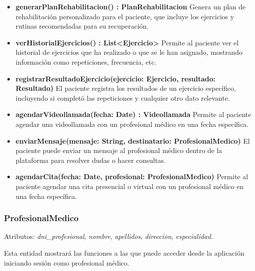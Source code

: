 \documentclass{article}
\begin{document}
\begin{itemize}
	\item \textbf{generarPlanRehabilitacion() : PlanRehabilitacion}  
	Genera un plan de rehabilitación personalizado para el paciente, que incluye los ejercicios y rutinas recomendadas para su recuperación.
	
	\item \textbf{verHistorialEjercicios() : List<Ejercicio>}  
	Permite al paciente ver el historial de ejercicios que ha realizado o que se le han asignado, mostrando información como repeticiones, frecuencia, etc.
	
	\item \textbf{registrarResultadoEjercicio(ejercicio: Ejercicio, resultado: Resultado)}  
	El paciente registra los resultados de un ejercicio específico, incluyendo si completó las repeticiones y cualquier otro dato relevante.
	
	\item \textbf{agendarVideollamada(fecha: Date) : Videollamada}  
	Permite al paciente agendar una videollamada con un profesional médico en una fecha específica.
	
	\item \textbf{enviarMensaje(mensaje: String, destinatario: ProfesionalMedico)}  
	El paciente puede enviar un mensaje al profesional médico dentro de la plataforma para resolver dudas o hacer consultas.
	
	\item \textbf{agendarCita(fecha: Date, profesional: ProfesionalMedico)}  
	Permite al paciente agendar una cita presencial o virtual con un profesional médico en una fecha específica.
\end{itemize}

\subsubsection*{ProfesionalMedico}
Atributos: \textit{dni\_profesional}, \textit{nombre}, \textit{apellidos}, \textit{direccion}, \textit{especialidad}.

Esta entidad mostrará las funciones a las que puede acceder desde la aplicación iniciando sesión como profesional médico.
\end{document}
